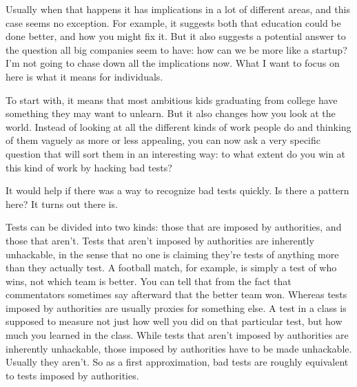 Usually when
                  that happens it has implications in a lot of different areas,
                  and this case seems no exception. For example, it suggests
                  both that education could be done better, and how you might
                  fix it. But it also suggests a potential answer to the
                  question all big companies seem to have: how can we be more
                  like a startup? I'm not going to chase down all the
                  implications now. What I want to focus on here is what it
                  means for individuals.

To start with, it means that
                  most ambitious kids graduating from college have something
                  they may want to unlearn. But it also changes how you look at
                  the world. Instead of looking at all the different kinds of
                  work people do and thinking of them vaguely as more or less
                  appealing, you can now ask a very specific question that will
                  sort them in an interesting way: to what extent do you win at
                  this kind of work by hacking bad tests?

It would
                  help if there was a way to recognize bad tests quickly. Is
                  there a pattern here? It turns out there is.

Tests
                  can be divided into two kinds: those that are imposed by
                  authorities, and those that aren't. Tests that aren't imposed
                  by authorities are inherently unhackable, in the sense that no
                  one is claiming they're tests of anything more than they
                  actually test. A football match, for example, is simply a test
                  of who wins, not which team is better. You can tell that from
                  the fact that commentators sometimes say afterward that the
                  better team won. Whereas tests imposed by authorities are
                  usually proxies for something else. A test in a class is
                  supposed to measure not just how well you did on that
                  particular test, but how much you learned in the class. While
                  tests that aren't imposed by authorities are inherently
                  unhackable, those imposed by authorities have to be made
                  unhackable. Usually they aren't. So as a first approximation,
                  bad tests are roughly equivalent to tests imposed by
                  authorities.


